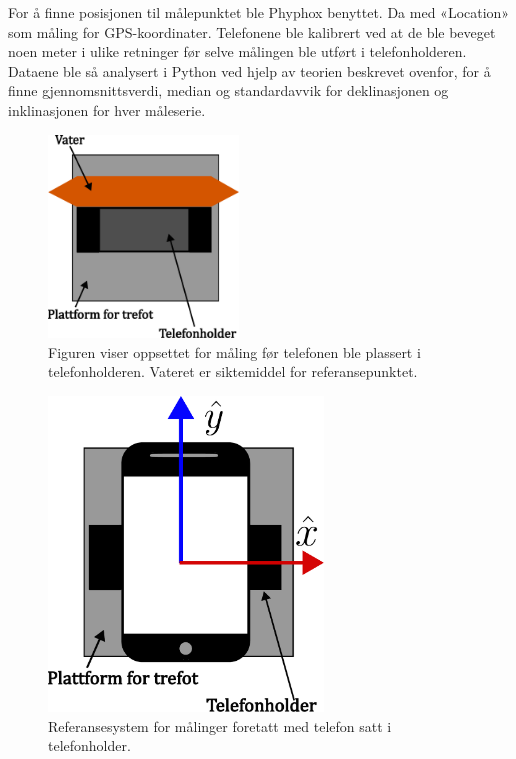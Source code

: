 For å finne posisjonen til målepunktet ble Phyphox benyttet. Da med «Location» som måling for GPS-koordinater. Telefonene ble kalibrert ved at de ble beveget noen meter i ulike retninger før selve målingen ble utført i telefonholderen. 
Dataene ble så analysert i Python ved hjelp av teorien beskrevet ovenfor, for å finne gjennomsnittsverdi, median og standardavvik for deklinasjonen og inklinasjonen for hver måleserie.     

 
\begin{figure}
    \centering
    \includegraphics[width=0.45\textwidth]{img/Plattform med vater.pdf}                 
    \caption{Figuren viser oppsettet for måling før telefonen ble plassert i telefonholderen. Vateret er siktemiddel for referansepunktet.}
    \label{fig:med_vater}
\end{figure}

\begin{figure}
    \centering
    \includegraphics[width=0.65\textwidth]{img/Plattform med telefoni.pdf}
    \caption{Referansesystem for målinger foretatt med telefon satt i telefonholder.}
    \label{fig:telf_akser}
\end{figure}